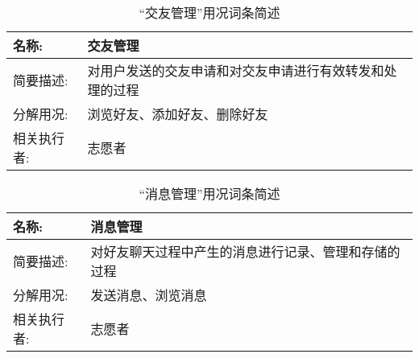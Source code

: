 \begin{table}[H]  
\caption{“交友管理”用况词条简述}  
\begin{center}  
    \begin{tabular}{l p{11cm}} 
        \hline
        \quad 名称:  & 交友管理 \\
        \hline
        \quad 简要描述:  & 对用户发送的交友申请和对交友申请进行有效转发和处理的过程 \\
        \hline
        \quad 分解用况:  & 浏览好友、添加好友、删除好友 \\
        \hline
        \quad 相关执行者:  & 志愿者 \\
        \hline
    \end{tabular}
    \label{tab1}
\end{center}
\end{table}

\begin{table}[H]  
\caption{“消息管理”用况词条简述}  
\begin{center}  
    \begin{tabular}{l p{11cm}} 
        \hline
        \quad 名称:  & 消息管理 \\
        \hline
        \quad 简要描述:  & 对好友聊天过程中产生的消息进行记录、管理和存储的过程 \\
        \hline
        \quad 分解用况:  & 发送消息、浏览消息 \\
        \hline
        \quad 相关执行者:  & 志愿者 \\
        \hline
    \end{tabular}
    \label{tab1}
\end{center}
\end{table}
